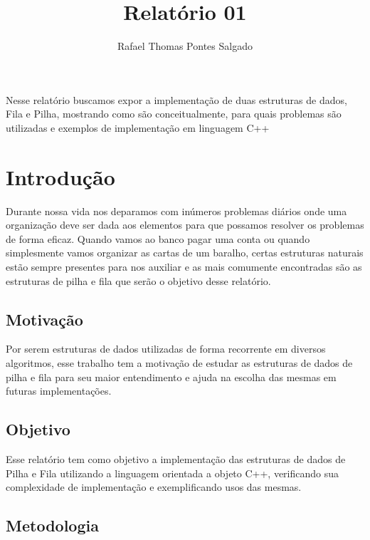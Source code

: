 \documentclass[rascunho,xindy,sublist]{fei}
\author{Rafael Thomas Pontes Salgado}
\title{Relatório 01}
\begin{document}
\maketitle

\begin{resumo}
Nesse relatório buscamos expor a implementação de duas estruturas de dados, Fila e Pilha, mostrando como são conceitualmente, para quais problemas são utilizadas e exemplos de implementação em linguagem C++ 
\end{resumo}

\tableofcontents

\chapter{Introdução}

Durante nossa vida nos deparamos com inúmeros problemas diários onde uma organização deve ser dada aos elementos para que possamos resolver os problemas de forma eficaz. Quando vamos ao banco pagar uma conta ou quando simplesmente vamos organizar as cartas de um baralho, certas estruturas naturais estão sempre presentes para nos auxiliar e as mais comumente encontradas são as estruturas de pilha e fila que serão o objetivo desse relatório.

\section{Motivação}

Por serem estruturas de dados utilizadas de forma recorrente em diversos algoritmos, esse trabalho tem a motivação de estudar as estruturas de dados de pilha e fila para seu maior entendimento e ajuda na escolha das mesmas em futuras implementações.

\section{Objetivo}

Esse relatório tem como objetivo a implementação das estruturas de dados de Pilha e Fila utilizando a linguagem orientada a objeto C++, verificando sua complexidade de implementação e exemplificando usos das mesmas.

\section{Metodologia}
\end{document}
